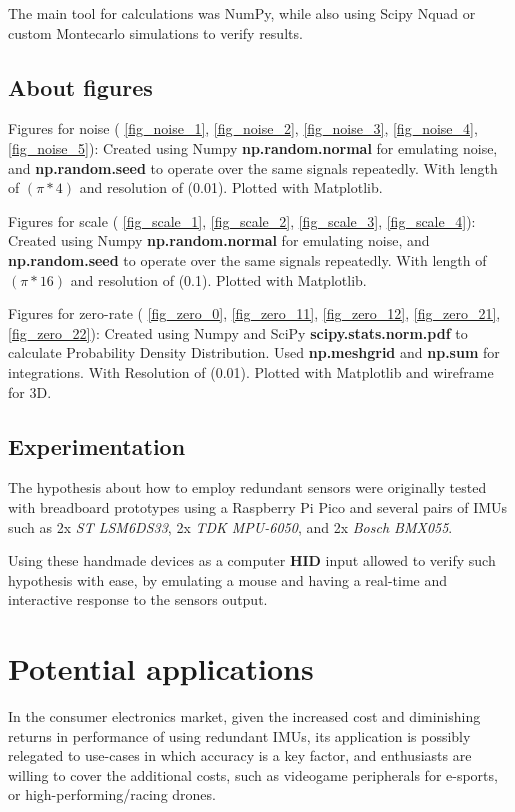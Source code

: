\documentclass[10pt, twocolumn, a4paper]{article}
\begin{document}
    The main tool for calculations was NumPy, while also using Scipy Nquad or custom Montecarlo simulations to verify results.

    \subsection{About figures}
        Figures for noise (
            \ref{fig_noise_1},
            \ref{fig_noise_2},
            \ref{fig_noise_3},
            \ref{fig_noise_4},
            \ref{fig_noise_5}):
            Created using Numpy \textbf{np.random.normal} for emulating noise, and \textbf{np.random.seed} to operate over the same signals repeatedly. With length of $(\pi * 4)$ and resolution of (0.01). Plotted with Matplotlib.

        Figures for scale (
            \ref{fig_scale_1},
            \ref{fig_scale_2},
            \ref{fig_scale_3},
            \ref{fig_scale_4}):
            Created using Numpy \textbf{np.random.normal} for emulating noise, and \textbf{np.random.seed} to operate over the same signals repeatedly. With length of $(\pi * 16)$ and resolution of (0.1). Plotted with Matplotlib.

        Figures for zero-rate (
            \ref{fig_zero_0},
            \ref{fig_zero_11},
            \ref{fig_zero_12},
            \ref{fig_zero_21},
            \ref{fig_zero_22}):
            Created using Numpy and SciPy \textbf{scipy.stats.norm.pdf} to calculate Probability Density Distribution. Used \textbf{np.meshgrid} and \textbf{np.sum} for integrations. With Resolution of (0.01). Plotted with Matplotlib and wireframe for 3D.

    \subsection{Experimentation}
    The hypothesis about how to employ redundant sensors were originally tested with breadboard prototypes using a Raspberry Pi Pico and several pairs of IMUs such as 2x \emph{ST LSM6DS33}, 2x \emph{TDK MPU-6050}, and 2x \emph{Bosch BMX055}.

    Using these handmade devices as a computer \textbf{HID} input allowed to verify such hypothesis with ease, by emulating a mouse and having a real-time and interactive response to the sensors output.


\section{Potential applications}
    In the consumer electronics market, given the increased cost and diminishing returns in performance of using redundant IMUs, its application is possibly relegated to use-cases in which accuracy is a key factor, and enthusiasts are willing to cover the additional costs, such as videogame peripherals for e-sports, or high-performing/racing drones.
\end{document}
